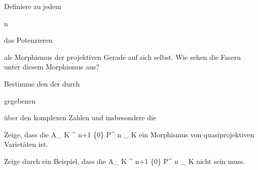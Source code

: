 {} {}



{}

{


Definiere zu jedem


\mavergleichskette

{\vergleichskette

{ n
}

{ \in }{ \Z
}

{  }{
}

{    }{
}

{   }{
}

}
{}{}{}
das Potenzieren

 als Morphismus der projektiven Gerade auf sich selbst. Wie sehen die Fasern unter diesem Morphismus aus?


}

{} {}



{}

{


Bestimme den
 der durch


 {  }


gegebenen

 über den komplexen Zahlen und insbesondere die 


}

{} {}



{}

{


Zeige, dass die
\maabbdisp {} { { {\mathbb A}_{  K  }^{ n+1  } } \setminus \{0\} } { {\mathbb P}^{ n }_{ K }
} {}
ein Morphismus von quasiprojektiven Varietäten ist.


}

{} {}



{}

{


Zeige durch ein Beispiel, dass die
\maabbdisp {} { { {\mathbb A}_{  K  }^{ n+1  } } \setminus \{0\} } { {\mathbb P}^{ n }_{ K }
} {}
nicht
sein muss.


}

{} {}


